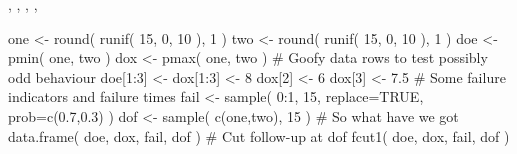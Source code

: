 \begin{SeeAlso}\relax
{},
,
,
,
\end{SeeAlso}
\begin{Examples}
\begin{ExampleCode}
one <- round( runif( 15, 0, 10 ), 1 )
two <- round( runif( 15, 0, 10 ), 1 )
doe <- pmin( one, two )
dox <- pmax( one, two )
# Goofy data rows to test possibly odd behaviour
doe[1:3] <- dox[1:3] <- 8
dox[2] <- 6
dox[3] <- 7.5
# Some failure indicators and failure times
fail <- sample( 0:1, 15, replace=TRUE, prob=c(0.7,0.3) )
dof <- sample( c(one,two), 15 )
# So what have we got
data.frame( doe, dox, fail, dof )
# Cut follow-up at dof
fcut1( doe, dox, fail, dof )
\end{ExampleCode}
\end{Examples}

